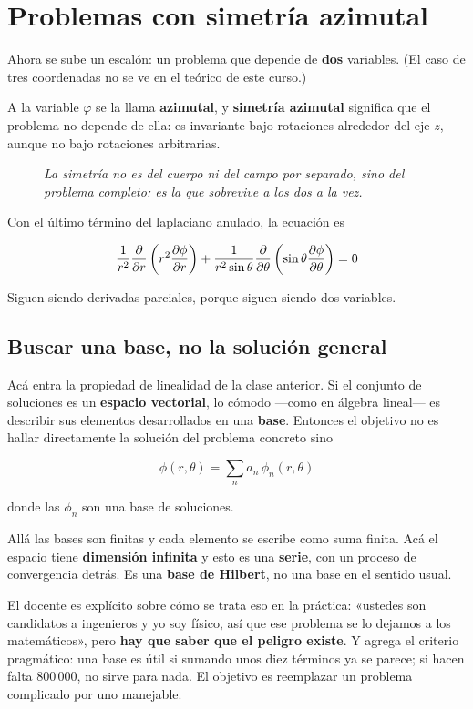 \documentclass[12pt,a4paper]{article}
\begin{document}
\section{Problemas con simetría azimutal}

Ahora se sube un escalón: un problema que depende de \textbf{dos} variables. (El
caso de tres coordenadas no se ve en el teórico de este curso.)

A la variable $\varphi$ se la llama \textbf{azimutal}, y \textbf{simetría
azimutal} significa que el problema no depende de ella: es invariante bajo
rotaciones alrededor del eje $z$, aunque no bajo rotaciones arbitrarias.

\begin{figure}[H]
  \centering
  
  \caption*{\small\itshape La simetría no es del cuerpo ni del campo por
  separado, sino del problema completo: es la que sobrevive a los dos a la vez.}
\end{figure}

Con el último término del laplaciano anulado, la ecuación es

\[
\frac{1}{r^2}\pdv{r}\left(r^2\pdv{\phi}{r}\right)
+ \frac{1}{r^2\sin\theta}\pdv{\theta}\left(\sin\theta\pdv{\phi}{\theta}\right) = 0
\]

Siguen siendo derivadas parciales, porque siguen siendo dos variables.

\subsection{Buscar una base, no la solución general}

Acá entra la propiedad de linealidad de la clase anterior. Si el conjunto de
soluciones es un \textbf{espacio vectorial}, lo cómodo ---como en álgebra
lineal--- es describir sus elementos desarrollados en una \textbf{base}. Entonces
el objetivo no es hallar directamente la solución del problema concreto sino

\[
\phi(r,\theta) = \sum_n a_n\,\phi_n(r,\theta)
\]

donde las $\phi_n$ son una base de soluciones.

\begin{warnbox}
Allá las bases son finitas y cada elemento se escribe como suma finita. Acá el
espacio tiene \textbf{dimensión infinita} y esto es una \textbf{serie}, con un
proceso de convergencia detrás. Es una \textbf{base de Hilbert}, no una base en el
sentido usual.

El docente es explícito sobre cómo se trata eso en la práctica: «ustedes son
candidatos a ingenieros y yo soy físico, así que ese problema se lo dejamos a los
matemáticos», pero \textbf{hay que saber que el peligro existe}. Y agrega el
criterio pragmático: una base es útil si sumando unos diez términos ya se parece;
si hacen falta 800\,000, no sirve para nada. El objetivo es reemplazar un problema
complicado por uno manejable.
\end{warnbox}
\end{document}

